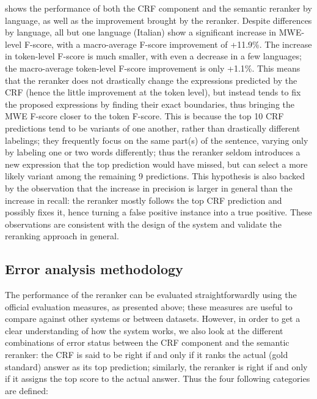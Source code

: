 \documentclass[output=paper
,modfonts
,nonflat]{langsci/langscibook}
\begin{document}
 shows the performance of both the CRF
component and the semantic reranker by language, as well as the
improvement brought by the reranker. Despite differences by language,
all but one language (Italian) show a significant increase in
MWE-level F-score, with a macro-average F-score improvement of
+11.9\%. The increase in token-level F-score is much smaller, with
even a decrease in a few languages; the macro-average token-level
F-score improvement is only +1.1\%. This means that the reranker does
not drastically change the expressions predicted by the CRF (hence the
little improvement at the token level), but instead tends to fix the
proposed expressions by finding their exact boundaries, thus bringing
the MWE F-score closer to the token F-score.  This is because the top
10 CRF predictions tend to be variants of one another, rather than
drastically different labelings; they frequently focus on the same
part(s) of the sentence, varying only by labeling one or two words
differently; thus the reranker seldom introduces a new expression that
the top prediction would have missed, but can select a more likely
variant among the remaining 9 predictions.  This hypothesis is also
backed by the observation that the increase in precision is larger in
general than the increase in recall: the reranker mostly follows the
top CRF prediction and possibly fixes it, hence turning a false
positive instance into a true positive.  These observations are
consistent with the design of the system and validate the reranking
approach in general.





\subsection{Error analysis methodology}

\label{moreau:sec:methodology}

The performance of the reranker can be evaluated straightforwardly
using the official evaluation measures, as presented above; these
measures are useful to compare against other systems or between
datasets. However, in order to get a clear understanding of how the
system works, we also look at the different combinations of error
status between the CRF component and the semantic reranker: the CRF is
said to be right if and only if it ranks the actual (gold standard)
answer as its top prediction; similarly, the reranker is right if and
only if it assigns the top score to the actual answer. Thus the four
following categories are defined:
\end{document}
